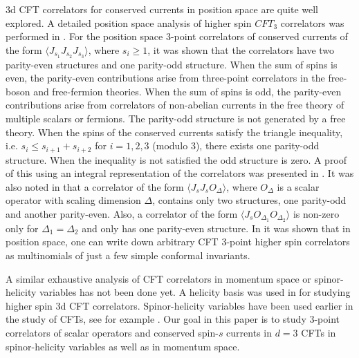 \documentclass[a4paper,11pt]{article}
\begin{document}
 3d CFT correlators for conserved currents in position space are quite well explored. A detailed position space analysis of higher spin $CFT_3$ correlators was performed in \cite{Giombi:2011rz}. 
For the position space 3-point correlators of conserved currents of the form $\langle J_{s_1}J_{s_2}J_{s_3}\rangle$, where $s_i\ge 1$, it was shown that the correlators have two parity-even structures and one parity-odd structure.
When the sum of spins is even, the parity-even contributions arise from three-point correlators in the free-boson and free-fermion theories. When the sum of spins is odd,  the parity-even contributions arise from correlators of non-abelian currents in the free theory of multiple scalars or fermions. The parity-odd structure is not generated by a free theory. When the spins of the conserved currents satisfy the triangle inequality, i.e. $s_i\le s_{i+1}+s_{i+2}$ for $i=1,2,3$ (modulo 3), there exists one parity-odd structure. When the inequality is not satisfied the odd structure is zero. A proof of this using an integral representation of the correlators was presented in \cite{Maldacena:2011jn}. It was also noted in \cite{Giombi:2011rz, Maldacena:2011jn} that a correlator of the form $\langle J_{s}J_{s}O_{\Delta}\rangle$, where $O_{\Delta}$ is a scalar operator with scaling dimension $\Delta$, contains only two structures, one parity-odd and another parity-even. Also, a correlator of the form $\langle J_{s}O_{\Delta_1}O_{\Delta_2}\rangle$ is non-zero only for $\Delta_1=\Delta_2$ and only has one parity-even structure.
 In \cite{Giombi:2011rz} it was shown that in position space, one can write down arbitrary CFT 3-point higher spin correlators as multinomials of just a few simple conformal invariants. 

A similar exhaustive analysis of CFT correlators in momentum space or spinor-helicity variables has not been done yet. 
A helicity basis was used in \cite{Caron-Huot:2021kjy} for studying higher spin 3d CFT correlators. Spinor-helicity variables have been used earlier in the study of CFTs, see for example \cite{Maldacena:2011nz, Mata:2012bx, Baumann:2020dch}.
Our goal in this paper is to study  3-point correlators of scalar operators and conserved spin-$s$ currents in $d=3$ CFTs in spinor-helicity variables as well as in momentum space.

\end{document}
